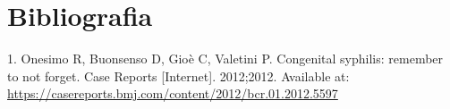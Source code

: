 \documentclass[italian,]{article}
\begin{document}
\clearpage

\hypertarget{bibliografia}{%
\section*{Bibliografia}\label{bibliografia}}

\hypertarget{refs}{}
\leavevmode\hypertarget{ref-onesimo2012}{}%
1. Onesimo R, Buonsenso D, Gioè C, Valetini P. Congenital syphilis:
remember to not forget. Case Reports {[}Internet{]}. 2012;2012.
Available at:
\url{https://casereports.bmj.com/content/2012/bcr.01.2012.5597}
\end{document}
